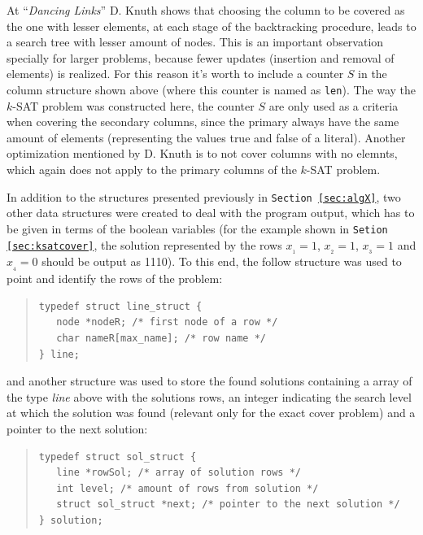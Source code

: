 \documentclass[12pt]{article}
\begin{document}
At ``\emph{Dancing Links}'' \cite{knuthDLX} D. Knuth shows that choosing the column to be covered as the one with lesser elements, at each stage of the backtracking procedure, leads to a search tree with lesser amount of nodes.
This is an important observation specially for larger problems, because fewer updates (insertion and removal of elements) is realized.
For this reason it's worth to include a counter $S$ in the column structure shown above (where this counter is named as \texttt{len}).
The way the $k$-SAT problem was constructed here, the counter $S$ are only used as a criteria when covering the secondary columns, since the primary always have the same amount of elements (representing the values true and false of a literal).
Another optimization mentioned by D. Knuth is to not cover columns with no elemnts, which again does not apply to the primary columns of the $k$-SAT problem.

In addition to the structures presented previously in \texttt{Section \ref{sec:algX}}, two other data structures were created to deal with the program output, which has to be given in terms of the boolean variables (for the example shown in \texttt{Setion \ref{sec:ksatcover}}, the solution represented by the rows $x_{_1} = 1$, $x_{_2} = 1$, $x_{_3} = 1$ and $x_{_4} = 0$ should be output as 1110).
To this end, the follow structure was used to point and identify the rows of the problem:
\\[-5pt]

\linespread{0.8}

{\footnotesize
  \begin{quote}
\begin{verbatim}
typedef struct line_struct {
   node *nodeR; /* first node of a row */
   char nameR[max_name]; /* row name */
} line;
\end{verbatim}
  \end{quote}
}

\linespread{1.5}

\noindent and another structure was used to store the found solutions containing a array of the type \emph{line} above with the solutions rows, an integer indicating the search level at which the solution was found (relevant only for the exact cover problem) and a pointer to the next solution:
\\[-5pt]

\linespread{0.8}

{\footnotesize
  \begin{quote}
\begin{verbatim}
typedef struct sol_struct {
   line *rowSol; /* array of solution rows */
   int level; /* amount of rows from solution */
   struct sol_struct *next; /* pointer to the next solution */
} solution;
\end{verbatim}
  \end{quote}
}
\end{document}
